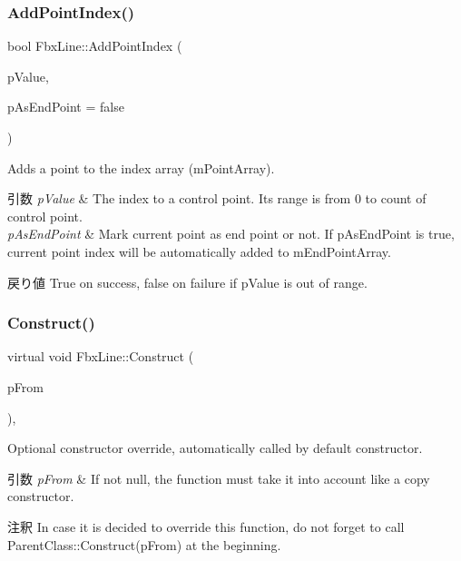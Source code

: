 \subsubsection{\texorpdfstring{Add\+Point\+Index()}{AddPointIndex()}}
{\footnotesize\ttfamily bool Fbx\+Line\+::\+Add\+Point\+Index (\begin{DoxyParamCaption}\item[{int}]{p\+Value,  }\item[{bool}]{p\+As\+End\+Point = {\ttfamily false} }\end{DoxyParamCaption})}

Adds a point to the index array (m\+Point\+Array). 
\begin{DoxyParams}{引数}
{\em p\+Value} & The index to a control point. Its range is from 0 to count of control point. \\
\hline
{\em p\+As\+End\+Point} & Mark current point as end point or not. If p\+As\+End\+Point is true, current point index will be automatically added to m\+End\+Point\+Array. \\
\hline
\end{DoxyParams}
\begin{DoxyReturn}{戻り値}
True on success, false on failure if p\+Value is out of range. 
\end{DoxyReturn}
\mbox{\label{class_fbx_line_a42d7e3fb4684712df04464644abee11a}} 
\subsubsection{\texorpdfstring{Construct()}{Construct()}}
{\footnotesize\ttfamily virtual void Fbx\+Line\+::\+Construct (\begin{DoxyParamCaption}\item[{const \hyperlink{class_fbx_object}{Fbx\+Object} $\ast$}]{p\+From }\end{DoxyParamCaption})\hspace{0.3cm}{\ttfamily [protected]}, {\ttfamily [virtual]}}

Optional constructor override, automatically called by default constructor. 
\begin{DoxyParams}{引数}
{\em p\+From} & If not null, the function must take it into account like a copy constructor. \\
\hline
\end{DoxyParams}
\begin{DoxyRemark}{注釈}
In case it is decided to override this function, do not forget to call Parent\+Class\+::\+Construct(p\+From) at the beginning. 
\end{DoxyRemark}


